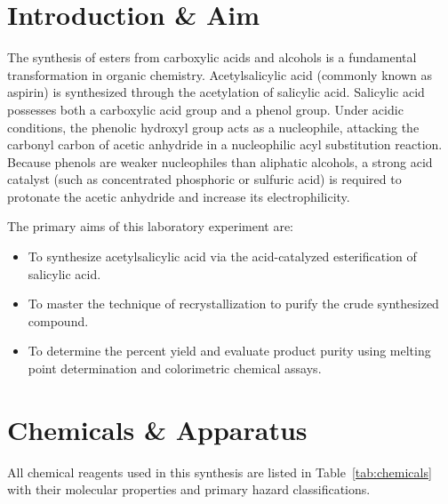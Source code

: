 \documentclass[11pt,a4paper]{article}
\begin{document}
\vspace{1em}

\section{Introduction \& Aim}
The synthesis of esters from carboxylic acids and alcohols is a fundamental transformation in organic chemistry. Acetylsalicylic acid (commonly known as aspirin) is synthesized through the acetylation of salicylic acid. Salicylic acid possesses both a carboxylic acid group and a phenol group. Under acidic conditions, the phenolic hydroxyl group acts as a nucleophile, attacking the carbonyl carbon of acetic anhydride in a nucleophilic acyl substitution reaction. Because phenols are weaker nucleophiles than aliphatic alcohols, a strong acid catalyst (such as concentrated phosphoric or sulfuric acid) is required to protonate the acetic anhydride and increase its electrophilicity.

The primary aims of this laboratory experiment are:
\begin{itemize}[itemsep=0pt, topsep=2pt]
    \item To synthesize acetylsalicylic acid via the acid-catalyzed esterification of salicylic acid.
    \item To master the technique of recrystallization to purify the crude synthesized compound.
    \item To determine the percent yield and evaluate product purity using melting point determination and colorimetric chemical assays.
\end{itemize}

\section{Chemicals \& Apparatus}
All chemical reagents used in this synthesis are listed in Table~\ref{tab:chemicals} with their molecular properties and primary hazard classifications.
\end{document}
